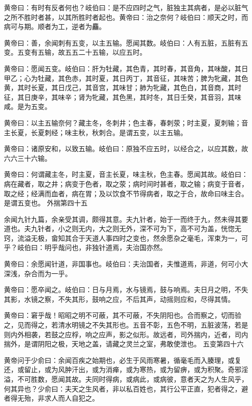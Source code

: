 \documentclass[a4paper,12pt,UTF8,twoside]{ctexbook}
\begin{document}
	黄帝曰：有时有反者何也？岐伯曰：是不应四时之气，脏独主其病者，是必以脏气之所不胜时者甚，以其所胜时者起也。黄帝曰：治之奈何？岐伯曰：顺天之时，而病可与期。顺者为工，逆者为麤。
	
	黄帝曰：善，余闻刺有五变，以主五输。愿闻其数。岐伯曰：人有五脏，五脏有五变。五变有五输，故五五二十五输，以应五时。
	
	黄帝曰：愿闻五变。岐伯曰：肝为牡藏，其色青，其时春，其音角，其味酸，其日甲乙；心为牡藏，其色赤，其时夏，其日丙丁，其音征，其味苦；脾为牝藏，其色黄，其时长夏，其日戊己，其音宫，其味甘；肺为牝藏，其色白，其音商，其时征，其日庚辛，其味辛；肾为牝藏，其色黑，其时冬，其日壬癸，其音羽，其味咸。是为五变。
	
	黄帝曰：以主五输奈何？藏主冬，冬刺井；色主春，春刺荥；时主夏，夏刺输；音主长夏，长夏刺经；味主秋，秋刺合。是谓五变，以主五输。
	
	黄帝曰：诸原安和，以致五输。岐伯曰：原独不应五时，以经合之，以应其数，故六六三十六输。
	
	黄帝曰：何谓藏主冬，时主夏，音主长夏，味主秋，色主春。愿闻其故。岐伯曰：病在藏者，取之井；病变于色者，取之荥；病时间时甚者，取之输；病变于音者，取之经；经满而血者，病在胃；及以饮食不节得病者，取之于合，故命曰味主合。是谓五变也。
	外揣第四十五
	
	余闻九针九篇，余亲受其调，颇得其意。夫九针者，始于一而终于九，然未得其要道也。夫九针者，小之则无内，大之则无外，深不可为下，高不可为盖，恍惚无窍，流溢无极，畲知其合于天道人事四时之变也，然余愿杂之毫毛，浑束为一，可乎？岐伯曰：明乎哉问也，非独针道焉，夫治国亦然。
	
	黄帝曰：余愿闻针道，非国事也。岐伯曰：夫治国者，夫惟道焉，非道，何可小大深浅，杂合而为一乎。
	
	黄帝曰：愿卒闻之。岐伯曰：日与月焉，水与镜焉，鼓与响焉。夫日月之明，不失其影，水镜之察，不失其形，鼓响之应，不后其声，动摇则应和，尽得其情。
	
	黄帝曰：窘乎哉！昭昭之明不可蔽，其不可蔽，不失阴阳也。合而察之，切而验之，见而得之，若清水明镜之不失其形也。五音不彰，五色不明，五脏波荡，若是则内外相袭，若鼓之应桴，响之应声，影之似形。故远者，司外揣内，近者，司内揣外，是谓阴阳之极，天地之盖，请藏之灵兰之室，弗敢使泄也。
	五变第四十六
	
	黄帝问于少俞曰：余闻百疾之始期也，必生于风雨寒暑，循毫毛而入腠理，或复还，或留止，或为风肿汗出，或为消瘅，或为寒热，或为留痹，或为积聚。奇邪淫溢，不可胜数，愿闻其故。夫同时得病，或病此，或病彼，意者天之为人生风乎，何其异也？少俞曰：夫天之生风者，非以私百姓也，其行公平正直，犯者得之，避者得无殆，非求人而人自犯之。
	
\end{document}
